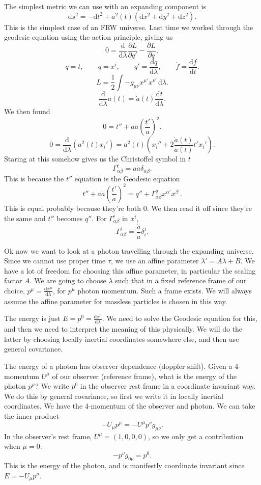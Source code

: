 
The simplest metric we can use with an expanding component is
\[
	\mathrm{d} s^2=-\mathrm{d} t^2+a^2(t)\left( \mathrm{d} x^2+\mathrm{d} y^2+\mathrm{d} z^2 \right) 
.\]
This is the simplest case of an FRW universe. Last time we worked through the geodesic equation using the action principle, giving us
\[
	0=\frac{\mathrm{d}}{\mathrm{d}\lambda } \frac{\partial L}{\partial q'} -\frac{\partial L}{\partial q} ,
\]
\[
	q=t,\qquad q=x^i,\qquad q'=\frac{\mathrm{d}q}{\mathrm{d}\lambda } ,\qquad \dot{f} =\frac{\mathrm{d}f}{\mathrm{d}t} 
.\]
\[
	L=\frac{1}{2} \int -g_{\mu \nu } x^{\mu '} x^{\nu '}  \,\mathrm{d} \lambda 
.\]
\[
	\frac{\mathrm{d}}{\mathrm{d}\lambda } a(t)=\dot{a} (t)\frac{\mathrm{d}t}{\mathrm{d}\lambda } 
.\]
We then found
\[
	0=t''+a \dot{a} \left( \frac{t'}{a}  \right) ^2
.\]
\[
	0=\frac{\mathrm{d}}{\mathrm{d}\lambda } \left( a^2(t)x_i' \right) =a^2(t)\left(x_i''+2\frac{\dot{a} (t)}{a(t)} t'x_i'\right)
.\]
Staring at this somehow gives us the Christoffel symbol in $t$
\[
	\Gamma_{\alpha \beta } ^t=a\dot{a} \delta _{\alpha \beta }
.\]
This is because the $t''$ equation is the Geodesic equation
\[
	t''+a \dot{a} \left( \frac{t'}{a}  \right) ^2=q''+\Gamma _{\alpha \beta } ^q x^{\alpha '} x^{\beta '} 
.\]
This is equal probably because they're both 0. We then read it off since they're the same and $t''$ becomes $q''$. For $\Gamma _{\alpha \beta } ^i$ in $x^i$,
\[
	\Gamma _{\alpha \beta } ^i=\frac{\dot{a} }{a}\delta _i^j
.\]

Ok now we want to look at a photon travelling through the expanding universe. Since we cannot use proper time $\tau $, we use an affine parameter $\lambda '=A\lambda +B$. We have a lot of freedom for choosing this affine parameter, in particular the scaling factor $A$. We are going to choose $\lambda $ such that in a fixed reference frame of our choice, $p^\mu =\frac{\mathrm{d}x^\mu }{\mathrm{d}\lambda } $, for $p^\mu $ photon momentum. Such a frame exists. We will always assume the affine parameter for massless particles is chosen in this way.

The energy is just $E=p^0=\frac{\mathrm{d}x^0}{\mathrm{d}\lambda } $. We need to solve the Geodesic equation for this, and then we need to interpret the meaning of this physically. We will do the latter by choosing locally inertial coordinates somewhere else, and then use general covariance.

The energy of a photon has observer dependence (doppler shift). Given a 4-momentum $U^\mu $ of our observer (reference frame), what is the energy of the photon $p^\mu $? We write $p^0$ in the observer rest frame in a coordinate invariant way. We do this by general covariance, so first we write it in locally inertial coordinates. We have the 4-momentum of the observer and photon. We can take the inner product
\[
	-U_{\mu } p^\mu =-U^\mu p^\nu g_{\mu \nu } 
.\]
In the observer's rest frame, $U^\mu =(1,0,0,0)$, so we only get a contribution when $\mu =0$:
\[
	-p^\nu g_{0 \nu } =p^0
.\]
This is the energy of the photon, and is manifestly coordinate invariant since $E=-U_\mu p^\mu $.

